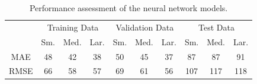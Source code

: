 \begin{table}[h]
\centering
{
\begin{tabular}{c|c|c|c|c|c|c|c|c|c|}
\multicolumn{1}{l|}{} & \multicolumn{3}{c|}{Training Data}                                               & \multicolumn{3}{c|}{Validation Data}                                             & \multicolumn{3}{c|}{Test Data}                                                   \\ \cline{2-10} 
\multicolumn{1}{l|}{} & \multicolumn{1}{c|}{Sm.} & \multicolumn{1}{c|}{Med.} & \multicolumn{1}{c|}{Lar.} & \multicolumn{1}{c|}{Sm.} & \multicolumn{1}{c|}{Med.} & \multicolumn{1}{c|}{Lar.} & \multicolumn{1}{c|}{Sm.} & \multicolumn{1}{c|}{Med.} & \multicolumn{1}{c|}{Lar.} \\ \hline
MAE                   & 48                       & 42                        & 38                        & 50                       & 45                        & 37                        & 87                       & 87                        & 91                        \\
RMSE                  & 66                       & 58                        & 57                        & 69                       & 61                        & 56                        & 107                      & 117                       & 118                       \\
\end{tabular}}
    \caption{Performance assessment of the neural network models.}
    \label{tab:02NNPE}
\end{table}

